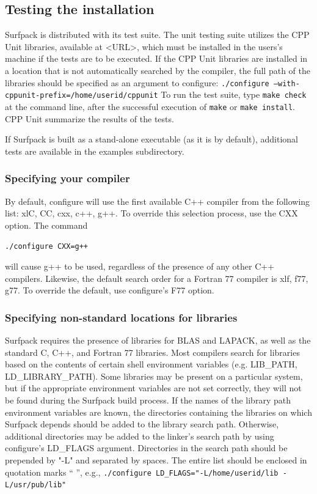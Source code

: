 \documentclass{article}
\begin{document}
\subsection{Testing the installation}
Surfpack is distributed with its test suite.  The unit testing suite utilizes the CPP Unit libraries, available at <URL>, which must be installed in the users's machine if the tests are to be executed.  If the CPP Unit libraries are installed in a location that is not automatically searched by the compiler, the full path of the libraries should be specified as an argument to configure:
\texttt{./configure --with-cppunit-prefix=/home/userid/cppunit}
To run the test suite, type \texttt{make check} at the command line, after the successful execution of \texttt{make} or \texttt{make install}.  CPP Unit summarize the results of the tests.

If Surfpack is built as a stand-alone executable (as it is by default), additional tests are available in the examples subdirectory.

\subsubsection{Specifying your compiler}
By default, configure will use the first available C++ compiler from the following list: xlC, CC, cxx, c++, g++.  To override this selection process, use the CXX option.  The command

\texttt{./configure CXX=g++}

will cause g++ to be used, regardless of the presence of any other C++ compilers.  Likewise, the default search order for a Fortran 77 compiler is xlf, f77, g77.  To override the default, use configure's F77 option.

\subsubsection{Specifying non-standard locations for libraries}
Surfpack requires the presence of libraries for BLAS and LAPACK, as well as the standard C, C++, and Fortran 77 libraries.  Most compilers search for libraries based on the contents of certain shell environment variables (e.g. LIB\_PATH, LD\_LIBRARY\_PATH).  Some libraries may be present on a particular system, but if the appropriate environment variables are not set correctly, they will not be found during the Surfpack build process.  If the names of the library path environment variables are known, the directories containing the libraries on which Surfpack depends should be added to the library search path.  Otherwise, additional directories may be added to the linker's search path by using configure's LD\_FLAGS argument.  Directories in the search path should be prepended by "-L" and separated by spaces.  The entire list should be enclosed in quotation marks `` '', e.g.,
\texttt{./configure LD\_FLAGS="-L/home/userid/lib -L/usr/pub/lib"}
\end{document}
